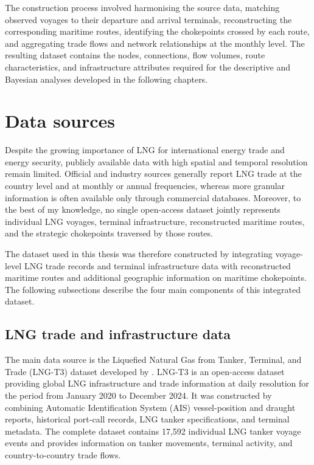 \documentclass[pdftex,12pt,openright,a4paper,oneside]{book}
\begin{document}
The construction process involved harmonising the source data, matching observed voyages to their departure and arrival terminals, reconstructing the corresponding maritime routes, identifying the chokepoints crossed by each route, and aggregating trade flows and network relationships at the monthly level. The resulting dataset contains the nodes, connections, flow volumes, route characteristics, and infrastructure attributes required for the descriptive and Bayesian analyses developed in the following chapters.

\section{Data sources}
\label{sec:data_sources}
Despite the growing importance of LNG for international energy trade and energy security, publicly available data with high spatial and temporal resolution remain limited. Official and industry sources generally report LNG trade at the country level and at monthly or annual frequencies, whereas more granular information is often available only through commercial databases. Moreover, to the best of my knowledge, no single open-access dataset jointly represents individual LNG voyages, terminal infrastructure, reconstructed maritime routes, and the strategic chokepoints traversed by those routes.

The dataset used in this thesis was therefore constructed by integrating voyage-level LNG trade records and terminal infrastructure data with reconstructed maritime routes and additional geographic information on maritime chokepoints. The following subsections describe the four main components of this integrated dataset.

\subsection{LNG trade and infrastructure data}
\label{subsec:lng_trade_infrastructure}
The main data source is the Liquefied Natural Gas from Tanker, Terminal, and Trade (LNG-T3) dataset developed by \citet{zhou2026}. LNG-T3 is an open-access dataset providing global LNG infrastructure and trade information at daily resolution for the period from January 2020 to December 2024. It was constructed by combining Automatic Identification System (AIS) vessel-position and draught reports, historical port-call records, LNG tanker specifications, and terminal metadata. The complete dataset contains 17,592 individual LNG tanker voyage events and provides information on tanker movements, terminal activity, and country-to-country trade flows.
\end{document}
